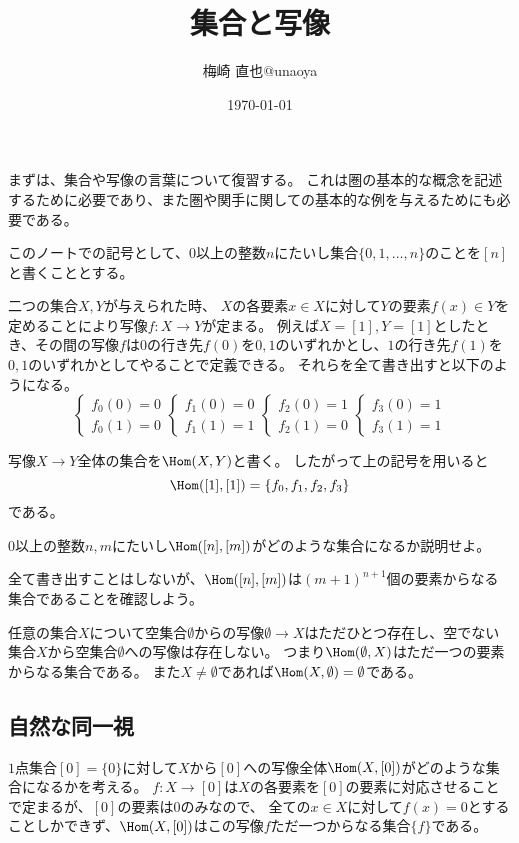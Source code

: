 \documentclass{jsarticle}
\title{集合と写像}
\author{梅崎 直也@unaoya}
\date{\today}
\begin{document}
\maketitle

まずは、集合や写像の言葉について復習する。
これは圏の基本的な概念を記述するために必要であり、また圏や関手に関しての基本的な例を与えるためにも必要である。

\begin{dfn}
このノートでの記号として、$0$以上の整数$n$にたいし集合$\{0,1,\ldots,n\}$のことを$[n]$と書くこととする。
\end{dfn}

二つの集合$X,Y$が与えられた時、
$X$の各要素$x\in X$に対して$Y$の要素$f(x)\in Y$を定めることにより写像$f\colon X\to Y$が定まる。
例えば$X=[1], Y=[1]$としたとき、その間の写像$f$は$0$の行き先$f(0)$を$0, 1$のいずれかとし、$1$の行き先$f(1)$を$0,1$のいずれかとしてやることで定義できる。
それらを全て書き出すと以下のようになる。
\[
\begin{cases}f_0(0)=0\\f_0(1)=0\end{cases}
\begin{cases}f_1(0)=0\\f_1(1)=1\end{cases}
\begin{cases}f_2(0)=1\\f_2(1)=0\end{cases}
\begin{cases}f_3(0)=1\\f_3(1)=1\end{cases}
\]

写像$X\to Y$全体の集合を$\Hom(X,Y)$と書く。
したがって上の記号を用いると
\[
\Hom([1],[1])=\{f_0,f_1,f_2,f_3\}
\]
である。

\begin{prob}
$0$以上の整数$n, m$にたいし$\Hom([n],[m])$がどのような集合になるか説明せよ。
\end{prob}
全て書き出すことはしないが、$\Hom([n],[m])$は$(m+1)^{n+1}$個の要素からなる集合であることを確認しよう。

任意の集合$X$について空集合$\emptyset$からの写像$\emptyset\to X$はただひとつ存在し、空でない集合$X$から空集合$\emptyset$への写像は存在しない。
つまり$\Hom(\emptyset,X)$はただ一つの要素からなる集合である。
また$X\neq\emptyset$であれば$\Hom(X,\emptyset)=\emptyset$である。

\subsection{自然な同一視}
$1$点集合$[0]=\{0\}$に対して$X$から$[0]$への写像全体$\Hom(X,[0])$がどのような集合になるかを考える。
$f:X \to [0]$は$X$の各要素を$[0]$の要素に対応させることで定まるが、$[0]$の要素は$0$のみなので、
全ての$x \in X$に対して$f(x)=0$とすることしかできず、$\Hom(X,[0])$はこの写像$f$ただ一つからなる集合$\{f\}$である。
\end{document}
